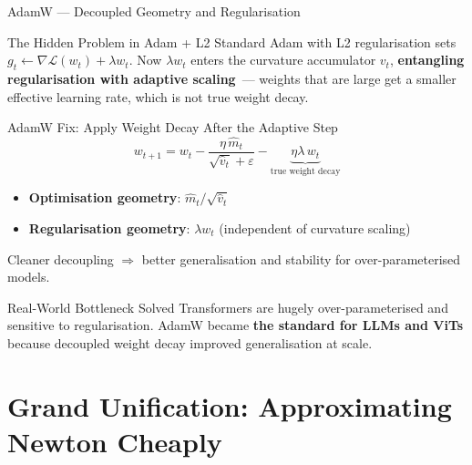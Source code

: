 \documentclass{beamer}
\begin{document}
\begin{frame}[shrink=10]{AdamW --- Decoupled Geometry and Regularisation}
  \begin{block}{The Hidden Problem in Adam + L2}
    Standard Adam with L2 regularisation sets
    $g_t \leftarrow \nabla\mathcal{L}(w_t) + \lambda w_t$.
    Now $\lambda w_t$ enters the curvature accumulator $v_t$,
    \textbf{entangling regularisation with adaptive scaling}~---
    weights that are large get a smaller effective learning rate,
    which is not true weight decay.
  \end{block}

  \medskip

  \begin{block}{AdamW Fix: Apply Weight Decay After the Adaptive Step}
    \[
      w_{t+1}
        = w_t
        - \frac{\eta\,\hat{m}_t}{\sqrt{\hat{v}_t}+\varepsilon}
        - \underbrace{\eta\lambda\,w_t}_{\text{true weight decay}}
    \]
    \begin{itemize}\setlength\itemsep{5pt}
      \item \textbf{Optimisation geometry}: $\hat{m}_t/\sqrt{\hat{v}_t}$
      \item \textbf{Regularisation geometry}: $\lambda w_t$
            (independent of curvature scaling)
    \end{itemize}
    Cleaner decoupling $\Rightarrow$ better generalisation and
    stability for over-parameterised models.
  \end{block}

  \begin{exampleblock}{Real-World Bottleneck Solved}
    Transformers are hugely over-parameterised and
    sensitive to regularisation.
    AdamW became \textbf{the standard for LLMs and ViTs} because
    decoupled weight decay improved generalisation at scale.
  \end{exampleblock}
\end{frame}

\section{Grand Unification: Approximating Newton Cheaply}
\end{document}
